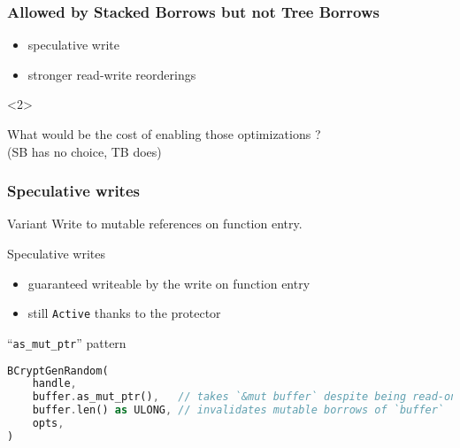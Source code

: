 

\begin{frame}
    \frametitle{Allowed by Stacked Borrows but not Tree Borrows}
    \begin{itemize}
        \item speculative write
        \item stronger read-write reorderings
    \end{itemize}

    \begin{onlyenv}<2>
        \begin{block}{}
            What would be the cost of enabling those optimizations ? \\
            (SB has no choice, TB does)
        \end{block}
    \end{onlyenv}
\end{frame}

\begin{frame}[fragile, t]
    \frametitle{Speculative writes}

    \begin{exampleblock}{Variant}
        Write to mutable references on function entry.
    \end{exampleblock}

    \begin{block}{{\cmark} Speculative writes}
        \begin{itemize}
            \item guaranteed writeable by the write on function entry
            \item still \texttt{Active} thanks to the protector
        \end{itemize}
    \end{block}

    \begin{block}{{\xmark} ``\texttt{as\_mut\_ptr}'' pattern}
        \begin{lstlisting}[language=rust, basicstyle=\ttfamily\scriptsize]
BCryptGenRandom(
    handle,
    buffer.as_mut_ptr(),   // takes `&mut buffer` despite being read-only
    buffer.len() as ULONG, // invalidates mutable borrows of `buffer`
    opts,
)
        \end{lstlisting}
    \end{block}
\end{frame}

